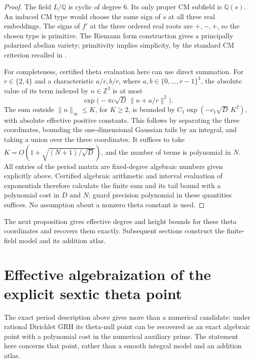 \documentclass[11pt]{article}
\theoremstyle{definition}
\theoremstyle{remark}
\begin{document}
\begin{proof}
The field \(L/\mathbb Q\) is cyclic of degree \(6\).
Its only proper CM subfield is \(\mathbb Q(s)\).
An induced CM type would choose the same sign of \(s\) at
all three real embeddings. The signs of \(f'\) at the three
ordered real roots are \(+,-,+\), so the chosen type is
primitive. The Riemann form construction gives a principally
polarized abelian variety; primitivity implies simplicity, by
the standard CM criterion recalled in
\citet[author/PDF p.~3]{BILV2016}.

For completeness, certified theta evaluation here can use direct
summation. For \(r\in\{2,4\}\) and a characteristic
\(a/r,b/r\), where \(a,b\in\{0,\ldots,r-1\}^3\), the
absolute value of its term indexed by \(n\in\mathbb Z^3\) is
at most
\[
 \exp\bigl(-\pi c\sqrt D\,\|n+a/r\|^2\bigr).
\]
The sum outside \(\|n\|_\infty\leq K\), for \(K\geq2\),
is bounded by \(C_1\exp(-c_1\sqrt D\,K^2)\), with absolute
effective positive constants. This follows by separating the
three coordinates, bounding the one-dimensional Gaussian tails
by an integral, and taking a union over the three coordinates.
It suffices to take
\(K=O(1+\sqrt{(N+1)/\sqrt D})\), and the number of terms is
polynomial in \(N\).
All entries of the period matrix are fixed-degree algebraic
numbers given explicitly above. Certified algebraic arithmetic
and interval evaluation of exponentials therefore calculate the
finite sum and its tail bound with a polynomial cost in
\(D\) and \(N\); guard precision polynomial in these quantities
suffices. No assumption about a nonzero theta constant is used.
\end{proof}

The next proposition gives effective degree and height bounds for these theta coordinates and recovers them exactly. Subsequent sections construct the finite-field model and its addition atlas.

\section{Effective algebraization of the explicit sextic theta point}
\label{sec:sextic-cm-algebraization}

The exact period description above gives more than a numerical candidate:
under rational Dirichlet GRH its theta-null point can be recovered as an
exact algebraic point with a polynomial cost in the numerical auxiliary
prime. The statement here concerns that point, rather than a smooth
integral model and an addition atlas.
\end{document}
